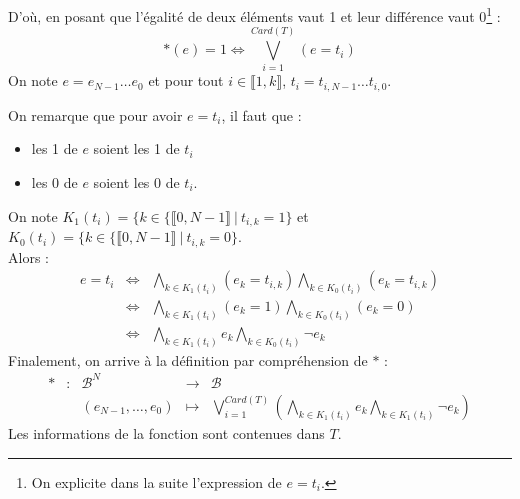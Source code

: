 \documentclass[../main.tex]{subfiles}
\begin{document}
D'où, en posant que l'égalité de deux éléments vaut 1 et leur différence vaut 0\footnote{On explicite dans la suite l'expression de $e = t_{i}$.} :
\begin{equation}
	\ast(e) = 1 \Leftrightarrow \displaystyle\bigvee_{i = 1}^{Card(T)}(e = t_i)
\end{equation}
On note $e = e_{N-1}\dots e_{0}$ et pour tout $i\in{\llbracket 1, k\rrbracket}$, $t_{i} = t_{i, N-1}\dots t_{i, 0}$.

On remarque que pour avoir $e = t_{i}$, il faut que :
\begin{itemize}
	\item les 1 de $e$ soient les 1 de $t_{i}$
	\item les 0 de $e$ soient les 0 de $t_{i}$.
\end{itemize}
On note $K_{1}(t_{i}) = \{k\in\{\llbracket 0, N-1\rrbracket\ |\ t_{i, k} = 1\}$ et $K_{0}(t_{i}) = \{k\in\{\llbracket 0, N-1\rrbracket\ |\ t_{i, k} = 0\}$. \\
Alors :
$$
\begin{array}{lcl}
	e = t_i & \Leftrightarrow & \displaystyle\bigwedge_{k\in{K_{1}(t_i)}}(e_k = t_{i, k})\displaystyle\bigwedge_{k\in{K_{0}(t_i)}}(e_k = t_{i, k}) \\
 & \Leftrightarrow & \displaystyle\bigwedge_{k\in{K_{1}(t_i)}}(e_k = 1)\displaystyle\bigwedge_{k\in{K_{0}(t_i)}}(e_k = 0) \\
 & \Leftrightarrow & \displaystyle\bigwedge_{k\in{K_{1}(t_i)}}e_k\displaystyle\bigwedge_{k\in{K_{0}(t_i)}}\neg{e_k}
\end{array}
$$
Finalement, on arrive à la définition par compréhension de $\ast$ :
\begin{displaymath}
\begin{array}{lclcl}
\ast & : & \mathcal{B}^{N} & \rightarrow & \mathcal{B} \\
& & (e_{N-1}, \dots, e_{0}) & \mapsto & \displaystyle\bigvee_{i = 1}^{Card(T)}\left(\displaystyle\bigwedge_{k\in{K_{1}(t_i)}}e_k\displaystyle\bigwedge_{k\in{K_{1}(t_i)}}\neg{e_k}\right)
\end{array}
\end{displaymath}
Les informations de la fonction sont contenues dans $T$.
\end{document}
